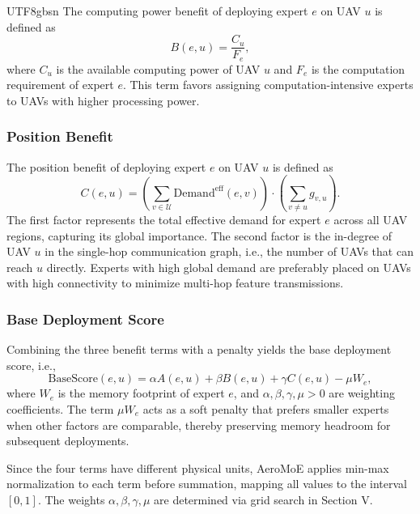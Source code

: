 \documentclass[journal]{IEEEtran}
\begin{document}
\begin{CJK*}{UTF8}{gbsn}
The computing power benefit of deploying expert \(e\) on UAV \(u\) is defined as
\begin{equation}
B(e, u) = \frac{C_u}{F_e},
\label{eq:B}
\end{equation}
where \(C_u\) is the available computing power of UAV \(u\) and \(F_e\) is the computation requirement of expert \(e\). This term favors assigning computation-intensive experts to UAVs with higher processing power.

\subsubsection{Position Benefit}

The position benefit of deploying expert \(e\) on UAV \(u\) is defined as
\begin{equation}
C(e, u) = \left( \sum_{v \in \mathcal{U}} \mathrm{Demand}^{\mathrm{eff}}(e, v) \right) \cdot \left( \sum_{v \neq u} g_{v, u} \right).
\label{eq:C}
\end{equation}
The first factor represents the total effective demand for expert \(e\) across all UAV regions, capturing its global importance. The second factor is the in-degree of UAV \(u\) in the single-hop communication graph, i.e., the number of UAVs that can reach \(u\) directly. Experts with high global demand are preferably placed on UAVs with high connectivity to minimize multi-hop feature transmissions.

\subsubsection{Base Deployment Score}

Combining the three benefit terms with a penalty yields the base deployment score, i.e.,
\begin{equation}
\mathrm{BaseScore}(e, u) = \alpha A(e, u) + \beta B(e, u) + \gamma C(e, u) - \mu W_e,
\label{eq:basescore}
\end{equation}
where \(W_e\) is the memory footprint of expert \(e\), and \(\alpha, \beta, \gamma, \mu > 0\) are weighting coefficients. The term \(\mu W_e\) acts as a soft penalty that prefers smaller experts when other factors are comparable, thereby preserving memory headroom for subsequent deployments.

Since the four terms have different physical units, AeroMoE applies min-max normalization to each term before summation, mapping all values to the interval \([0, 1]\). The weights \(\alpha, \beta, \gamma, \mu\) are determined via grid search in Section V.


\end{CJK*}
\end{document}
